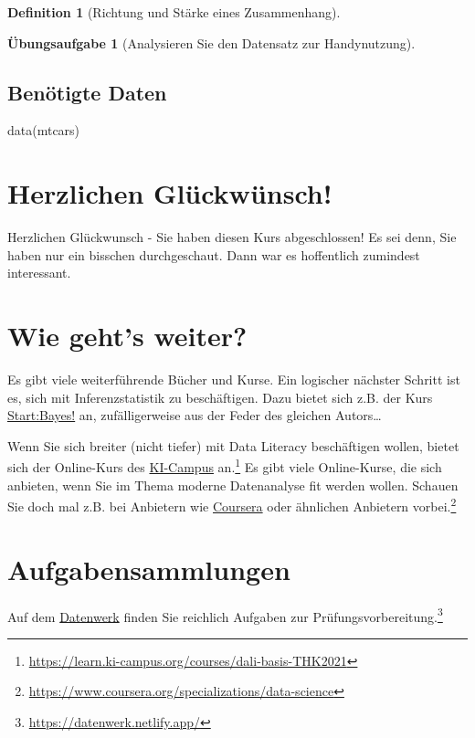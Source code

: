 \documentclass[
  a4paper,
  DIV=11]{scrreprt}
\newenvironment{Shaded}{\begin{snugshade}}{\end{snugshade}}
\newcommand{\FunctionTok}[1]{\textcolor[rgb]{0.28,0.35,0.67}{#1}}
\newcommand{\NormalTok}[1]{\textcolor[rgb]{0.00,0.23,0.31}{#1}}
\theoremstyle{definition}
\newtheorem{exercise}{Übungsaufgabe}[chapter]
\theoremstyle{definition}
\theoremstyle{definition}
\newtheorem{definition}{Definition}[chapter]
\theoremstyle{remark}
\begin{document}
\begin{definition}[Richtung und Stärke eines
Zusammenhang]
\begin{exercise}[Analysieren Sie den Datensatz zur
Handynutzung]
\subsection{Benötigte Daten}\label{benuxf6tigte-daten-8}

\begin{Shaded}
\begin{Highlighting}[]

\FunctionTok{data}\NormalTok{(mtcars)}
\end{Highlighting}
\end{Shaded}

\section{Herzlichen Glückwünsch!}\label{herzlichen-gluxfcckwuxfcnsch}


Herzlichen Glückwunsch - Sie haben diesen Kurs abgeschlossen! Es sei
denn, Sie haben nur ein bisschen durchgeschaut. Dann war es hoffentlich
zumindest interessant.

\section{Wie geht's weiter?}\label{wie-gehts-weiter}

Es gibt viele weiterführende Bücher und Kurse. Ein logischer nächster
Schritt ist es, sich mit Inferenzstatistik zu beschäftigen. Dazu bietet
sich z.B. der Kurs \href{https://start-bayes.netlify.app/}{Start:Bayes!}
an, zufälligerweise aus der Feder des gleichen Autors\ldots{}

Wenn Sie sich breiter (nicht tiefer) mit Data Literacy beschäftigen
wollen, bietet sich der Online-Kurs des
\href{https://learn.ki-campus.org/courses/dali-basis-THK2021}{KI-Campus}
an.\footnote{\url{https://learn.ki-campus.org/courses/dali-basis-THK2021}}
Es gibt viele Online-Kurse, die sich anbieten, wenn Sie im Thema moderne
Datenanalyse fit werden wollen. Schauen Sie doch mal z.B. bei Anbietern
wie
\href{https://www.coursera.org/specializations/data-science}{Coursera}
oder ähnlichen Anbietern vorbei.\footnote{\url{https://www.coursera.org/specializations/data-science}}

\section{Aufgabensammlungen}\label{aufgabensammlungen}

Auf dem \href{https://datenwerk.netlify.app/}{Datenwerk} finden Sie
reichlich Aufgaben zur Prüfungsvorbereitung.\footnote{\url{https://datenwerk.netlify.app/}}


\end{exercise}
\end{definition}
\end{document}

